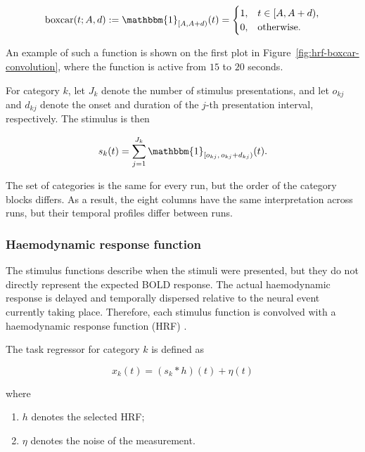 \documentclass[english]{pwr_wmat_praca_dyplomowa}
\theoremstyle{definition}
\theoremstyle{remark}
\begin{document}
\begin{equation}
    \operatorname{boxcar}(t; A,d)
    := \mathbbm{1}_{[A,A+d)}(t)
    =
    \begin{cases}
        1, & t \in [A,A+d),\\
        0, & \text{otherwise}.
    \end{cases}
\end{equation}

An example of such a function is shown on the first plot in Figure~\ref{fig:hrf-boxcar-convolution}, where the function is active from $15$ to $20$ seconds.

For category $k$, let $J_k$ denote the number of stimulus presentations, and let $o_{kj}$ and $d_{kj}$ denote the onset and duration of the $j$-th presentation interval, respectively. The stimulus is then

\begin{equation}
    s_k(t) = \sum_{j=1}^{J_k} \mathbbm{1}_{[o_{kj},\,o_{kj}+d_{kj})}(t).
    \label{eq:stimulus-function}
\end{equation}

The set of categories is the same for every run, but the order of the category blocks differs. As a result, the eight columns have the same interpretation across runs, but their temporal profiles differ between runs.

\subsubsection{Haemodynamic response function}

The stimulus functions describe when the stimuli were presented, but they do not directly represent the expected BOLD response. The actual haemodynamic response is delayed and temporally dispersed relative to the neural event currently taking place. Therefore, each stimulus function is convolved with a haemodynamic response function (HRF) \cite{hrf-theory}.

The task regressor for category $k$ is defined as \cite[Equation 1]{hrf-theory}

\begin{equation}
    x_k(t) = \left(s_k \ast h\right)(t) + \eta(t)
\end{equation}

where
\begin{enumerate}
    \item $h$ denotes the selected HRF;
    \item $\eta$ denotes the noise of the measurement.
\end{enumerate}
\end{document}
